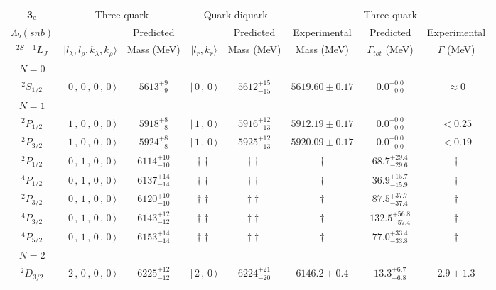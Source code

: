 \begin{tabular}{c| c c c c c c c}\hline \hline
${\bf {3}}_{\rm c}$ & \multicolumn{2}{c}{Three-quark} &  \multicolumn{2}{c}{Quark-diquark}   &    &  Three-quark  &\\ 
$\Lambda_{b}(snb)$ &   & Predicted  &   &  Predicted   &  Experimental &  Predicted            & Experimental \\ 
 $^{2S+1}L_{J}$ & $\vert l_{\lambda}, l_{\rho}, k_{\lambda}, k_{\rho} \rangle$ & Mass (MeV)  & $\vert l_{r}, k_{r} \rangle$  &  Mass (MeV)   &  Mass (MeV)   &  $\Gamma_{tot}$ (MeV) & $\Gamma$ (MeV) \\ \hline
\hline
 $N=0$  &  &  &  &  &  \\ 
$^{2}S_{1/2}$ & $\vert \,0\,,\,0\,,\,0\,,\,0 \,\rangle $ & $5613^{+9}_{-9}$ & $\vert \,0\,,\,0 \,\rangle$ & $5612^{+15}_{-15}$ & $5619.60\pm 0.17$ & $0.0^{+0.0}_{-0.0}$ & $\approx 0$ \\ 
\hline
 $N=1$  &  &  &  &  &  \\ 
$^{2}P_{1/2}$ & $\vert \,1\,,\,0\,,\,0\,,\,0 \,\rangle $ & $5918^{+8}_{-8}$ & $\vert \,1\,,\,0 \,\rangle$ & $5916^{+12}_{-13}$ & $5912.19\pm 0.17$ & $0.0^{+0.0}_{-0.0}$ & $<0.25$ \\ 
$^{2}P_{3/2}$ & $\vert \,1\,,\,0\,,\,0\,,\,0 \,\rangle $ & $5924^{+8}_{-8}$ & $\vert \,1\,,\,0 \,\rangle$ & $5925^{+12}_{-13}$ & $5920.09\pm 0.17$ & $0.0^{+0.0}_{-0.0}$ & $<0.19$ \\ 
$^{2}P_{1/2}$ & $\vert \,0\,,\,1\,,\,0\,,\,0 \,\rangle $ & $6114^{+10}_{-10}$ & $\dagger\dagger$ & $\dagger\dagger$ & $\dagger$ & $68.7^{+29.4}_{-29.6}$ & $\dagger$ \\ 
$^{4}P_{1/2}$ & $\vert \,0\,,\,1\,,\,0\,,\,0 \,\rangle $ & $6137^{+14}_{-14}$ & $\dagger\dagger$ & $\dagger\dagger$ & $\dagger$ & $36.9^{+15.7}_{-15.9}$ & $\dagger$ \\ 
$^{2}P_{3/2}$ & $\vert \,0\,,\,1\,,\,0\,,\,0 \,\rangle $ & $6120^{+10}_{-10}$ & $\dagger\dagger$ & $\dagger\dagger$ & $\dagger$ & $87.5^{+37.7}_{-37.4}$ & $\dagger$ \\ 
$^{4}P_{3/2}$ & $\vert \,0\,,\,1\,,\,0\,,\,0 \,\rangle $ & $6143^{+12}_{-12}$ & $\dagger\dagger$ & $\dagger\dagger$ & $\dagger$ & $132.5^{+56.8}_{-57.4}$ & $\dagger$ \\ 
$^{4}P_{5/2}$ & $\vert \,0\,,\,1\,,\,0\,,\,0 \,\rangle $ & $6153^{+14}_{-14}$ & $\dagger\dagger$ & $\dagger\dagger$ & $\dagger$ & $77.0^{+33.4}_{-33.8}$ & $\dagger$ \\ 
\hline
 $N=2$  &  &  &  &  &  \\ 
$^{2}D_{3/2}$ & $\vert \,2\,,\,0\,,\,0\,,\,0 \,\rangle $ & $6225^{+12}_{-12}$ & $\vert \,2\,,\,0 \,\rangle$ & $6224^{+21}_{-20}$ & $6146.2\pm 0.4$ & $13.3^{+6.7}_{-6.8}$ & $2.9\pm 1.3$ \\ 

\end{tabular}
